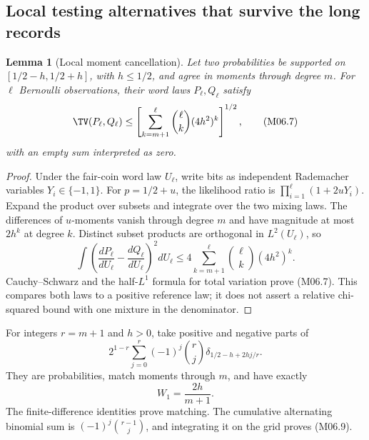 \documentclass[11pt,a4paper]{article}
\newtheorem{lemma}[theorem]{Lemma}
\theoremstyle{definition}\newtheorem{definition}[theorem]{Definition}
\theoremstyle{remark}\newtheorem{remark}[theorem]{Remark}
\numberwithin{equation}{section}
\begin{document}
\subsection{Local testing alternatives that survive the long records}\label{M06-sec-4}
\begin{lemma}[Local moment cancellation]\label{M06-lem:local}
Let two probabilities be supported on $[1/2-h,1/2+h]$, with $h\le1/2$, and agree in moments through degree $m$. For $\ell$ Bernoulli observations, their word laws $P_\ell,Q_\ell$ satisfy
\[
 \TV(P_\ell,Q_\ell)\le
 \left[\sum_{k=m+1}^{\ell}\binom{\ell}{k}(4h^2)^k\right]^{1/2},\tag{M06.7}
\]
with an empty sum interpreted as zero.
\end{lemma}
\begin{proof}
Under the fair-coin word law $U_\ell$, write bits as independent Rademacher variables $Y_i\in\{-1,1\}$. For $p=1/2+u$, the likelihood ratio is $\prod_{i=1}^{\ell}(1+2uY_i)$. Expand the product over subsets and integrate over the two mixing laws. The differences of $u$-moments vanish through degree $m$ and have magnitude at most $2h^k$ at degree $k$. Distinct subset products are orthogonal in $L^2(U_\ell)$, so
\[
 \int\left(\frac{dP_\ell}{dU_\ell}-\frac{dQ_\ell}{dU_\ell}\right)^2dU_\ell
 \le4\sum_{k=m+1}^{\ell}\binom{\ell}{k}(4h^2)^k.
\]
Cauchy--Schwarz and the half-$L^1$ formula for total variation prove (M06.7). This compares both laws to a positive reference law; it does not assert a relative chi-squared bound with one mixture in the denominator.
\end{proof}

For integers $r=m+1$ and $h>0$, take positive and negative parts of
\[
 2^{1-r}\sum_{j=0}^r(-1)^j\binom{r}{j}
     \delta_{1/2-h+2hj/r}.
\tag{M06.8}
\]
They are probabilities, match moments through $m$, and have exactly
\[
 W_1=\frac{2h}{m+1}.\tag{M06.9}
\]
The finite-difference identities prove matching. The cumulative alternating binomial sum is $(-1)^j\binom{r-1}{j}$, and integrating it on the grid proves (M06.9).
\end{document}
